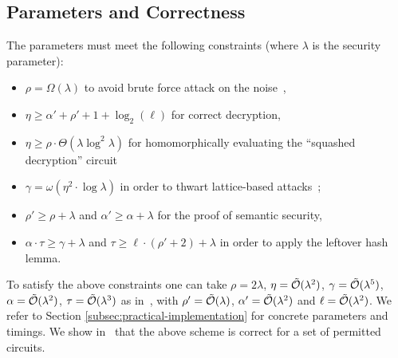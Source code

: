 \documentclass{llncs}
\renewcommand\geq\geqslant
\newcommand{\Ot}[1]{{\cal \tilde O}(#1)}
\newcommand\ignore[1]{}
\begin{document}
\subsection{Parameters and Correctness}

\label{s:constraints}

 The parameters must meet the following constraints (where $\lambda$ is the security parameter):
\begin{itemize}
\renewcommand{\labelitemi}{\tiny $\bullet$}
\itemsep.4em
\item $\rho = \Omega(\lambda)$ to avoid brute force attack on the noise~\cite{CN2012,CNT2012},

\item $\eta \geq \alpha'+\rho'+1+\log_2(\ell)$ for correct decryption,

\item  $\eta\geq \rho \cdot \Theta(\lambda\log^2\lambda)$ for
  homomorphically evaluating the ``squashed decryption'' circuit

\item $\gamma = \omega(\eta^2\cdot \log\lambda)$ in order to thwart
  lattice-based attacks~\cite{vDGHV2010,CMNT2011};

\item $\rho' \geq \rho + \lambda$ and  $\alpha' \geq \alpha+\lambda$  for
  the proof of semantic security,

\item $\alpha\cdot \tau\geq \gamma+\lambda$ and $\tau \geq \ell \cdot
  (\rho'+2) + \lambda$ in order to apply the
  leftover hash lemma.
\end{itemize}

To satisfy the above constraints one can take $\rho=2\lambda$,
$\eta=\Ot{\lambda^2}$, $\gamma=\Ot{\lambda^5}$,
$\alpha=\Ot{\lambda^2}$, $\tau=\Ot{\lambda^3}$ as in~\cite{CNT2012},
with $\rho'=\Ot{\lambda}$, $\alpha'=\Ot{\lambda^2}$ and $\ell=\Ot{\lambda^2}$.\ignore{ 
The main difference with the original DGHV scheme is that the
ciphertext expansion ratio becomes $\gamma/\ell=\Ot{\lambda^3}$
instead of $\gamma=\Ot{\lambda^5}$. However the public key size (using
the compressed public key technique from~\cite{CNT2012}) becomes 
$\Ot{\lambda^7}$ instead of $\Ot{\lambda^5}$.}
We refer to Section 
\ref{subsec:practical-implementation} for concrete parameters and
timings. We show in~\cite[Appendix~A]{CLT2013a} that  the above scheme
is correct for a set of permitted circuits. 


\end{document}
